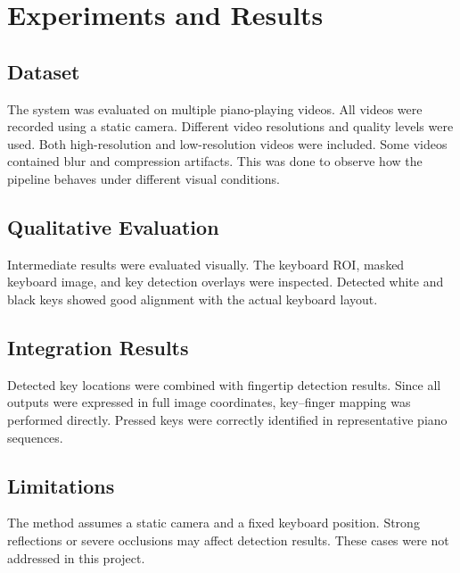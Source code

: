 \section{Experiments and Results}

\subsection{Dataset}

The system was evaluated on multiple piano-playing videos.
All videos were recorded using a static camera.
Different video resolutions and quality levels were used.
Both high-resolution and low-resolution videos were included.
Some videos contained blur and compression artifacts.
This was done to observe how the pipeline behaves
under different visual conditions.

\subsection{Qualitative Evaluation}

Intermediate results were evaluated visually.
The keyboard ROI,
masked keyboard image,
and key detection overlays
were inspected.
Detected white and black keys
showed good alignment with the actual keyboard layout.

\subsection{Integration Results}

Detected key locations were combined with fingertip detection results.
Since all outputs were expressed
in full image coordinates,
key--finger mapping was performed directly.
Pressed keys were correctly identified
in representative piano sequences.

\subsection{Limitations}

The method assumes a static camera and a fixed keyboard position.
Strong reflections or severe occlusions
may affect detection results.
These cases were not addressed in this project.
